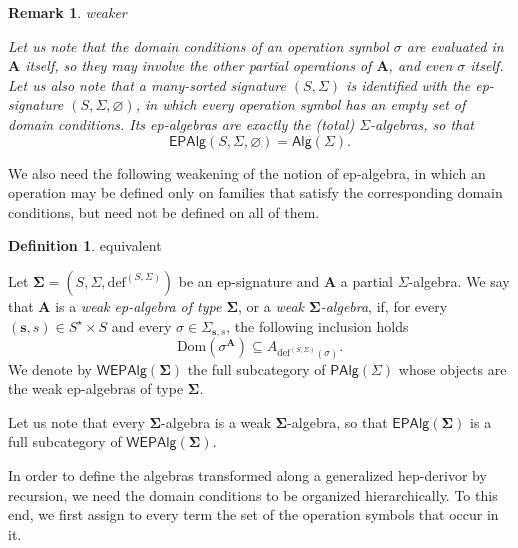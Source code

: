 \documentclass[a4paper, reqno]{amsbook}
\makeatletter
\newcommand{\sig}[1]{\mathbf{#1}}             %
\newcommand{\Dom}{\mathrm{Dom}}
\theoremstyle{plain}
\newtheorem{remark}[theorem]{Remark}
\theoremstyle{definition}
\newtheorem{definition}[theorem]{Definition}
\newcommand*{\CA@leanpending}{}
\newcommand*{\CA@leanrelation}{}
\newcommand*{\lean}[2]{%
  \ifcsname\string\color@lean@#1\endcsname\else
    \PackageError{main}{Unknown relation `#1' in \string\lean}{Use equivalent, weaker or stronger.}%
  \fi
  \gdef\CA@leanrelation{#1}%
  \gdef\CA@leanpending{#2}}
\makeatother
\begin{document}
\begin{remark}\label{REpAlg}\lean{weaker}{EPSignature.ofSignature_isEPAlgebra_iff}
Let us note that the domain conditions of an operation symbol $\sigma$ are evaluated in $\mathbf{A}$ itself, so they may involve the other partial operations of $\mathbf{A}$, and even $\sigma$ itself.
Let us also note that a many-sorted signature $(S,\Sigma)$ is identified with the ep-signature $(S,\Sigma,\varnothing)$, in which every operation symbol has an empty set of domain conditions.
Its ep-algebras are exactly the (total) $\Sigma$-algebras, so that
$$
\mathsf{EPAlg}(S,\Sigma,\varnothing)=\mathsf{Alg}(\Sigma).
$$
\end{remark}

We also need the following weakening of the notion of ep-algebra, in which an operation may be defined only on families that satisfy the corresponding domain conditions, but need not be defined on all of them.

\begin{definition}\label{DWeakEpAlg}\lean{equivalent}{EPSignature.IsWeakEPAlgebra}
Let $\sig{\Sigma}=(S,\Sigma,\mathrm{def}^{(S,\Sigma)})$ be an ep-signature and $\mathbf{A}$ a partial $\Sigma$-algebra.
We say that $\mathbf{A}$ is a \emph{weak ep-algebra of type $\sig{\Sigma}$}, or a \emph{weak $\sig{\Sigma}$-algebra}, if, for every $(\mathbf{s},s)\in S^{\star}\times S$ and every $\sigma\in\Sigma_{\mathbf{s},s}$, the following inclusion holds
$$
\Dom\left(\sigma^{\mathbf{A}}\right)\subseteq A_{\mathrm{def}^{(S,\Sigma)}(\sigma)}.
$$
We denote by $\mathsf{WEPAlg}(\sig{\Sigma})$ the full subcategory of $\mathsf{PAlg}(\Sigma)$ whose objects are the weak ep-algebras of type $\sig{\Sigma}$.
\end{definition}

Let us note that every $\sig{\Sigma}$-algebra is a weak $\sig{\Sigma}$-algebra, so that $\mathsf{EPAlg}(\sig{\Sigma})$ is a full subcategory of $\mathsf{WEPAlg}(\sig{\Sigma})$.

In order to define the algebras transformed along a generalized hep-derivor by recursion, we need the domain conditions to be organized hierarchically.
To this end, we first assign to every term the set of the operation symbols that occur in it.
\end{document}
